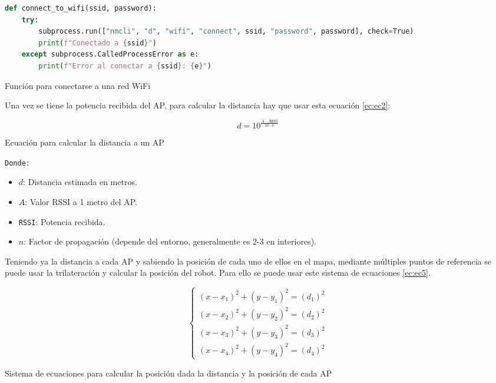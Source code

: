 \begin{code}[H]
\begin{lstlisting}[language=Python]
def connect_to_wifi(ssid, password):
    try:
        subprocess.run(["nmcli", "d", "wifi", "connect", ssid, "password", password], check=True)
        print(f"Conectado a {ssid}")
    except subprocess.CalledProcessError as e:
        print(f"Error al conectar a {ssid}: {e}")
\end{lstlisting}
\caption[Función para conectarse a una red WiFi]{Función para conectarse a una red WiFi}
\label{cod:codejemplo6}
\end{code}

Una vez se tiene la potencia recibida del AP, para calcular la distancia hay que usar esta ecuación \ref{ec:ec2}:




\begin{myequation}[H]
\begin{equation}
d = 10^{\frac{A - \texttt{RSSI}}{10 \cdot n}}
\label{ec:ec2}
\end{equation}
\caption[Ecuación para calcular la distancia a un AP]{Ecuación para calcular la distancia a un AP}
\end{myequation} 
\texttt{Donde:}
\begin{itemize}
    \item $d$: Distancia estimada en metros.
    \item $A$: Valor RSSI a 1 metro del AP.
    \item \texttt{RSSI}: Potencia recibida.
    \item $n$: Factor de propagación (depende del entorno, generalmente es 2-3 en interiores).
\end{itemize}


Teniendo ya la distancia a cada AP y sabiendo la posición de cada uno de ellos en el mapa, mediante múltiples puntos de referencia se puede usar la trilateración y calcular la posición del robot. Para ello se puede usar este sistema de ecuaciones \ref{ec:ec5}. 




\begin{myequation}[H]
\begin{equation}
\left\{
	\begin{array}{lcc}
		(x - x_1)^2 + (y - y_1)^2 = (d_1)^2\\
		(x - x_2)^2 + (y - y_2)^2 = (d_2)^2\\
		(x - x_3)^2 + (y - y_3)^2 = (d_3)^2 \\
		(x - x_4)^2 + (y - y_4)^2 = (d_4)^2
	\end{array}
\right.
\label{ec:ec5}
\end{equation}
\caption[Sistema de ecuaciones para calcular la posición dada la distancia y la posición de cada AP]{Sistema de ecuaciones para calcular la posición dada la distancia y la posición de cada AP}
\end{myequation}


